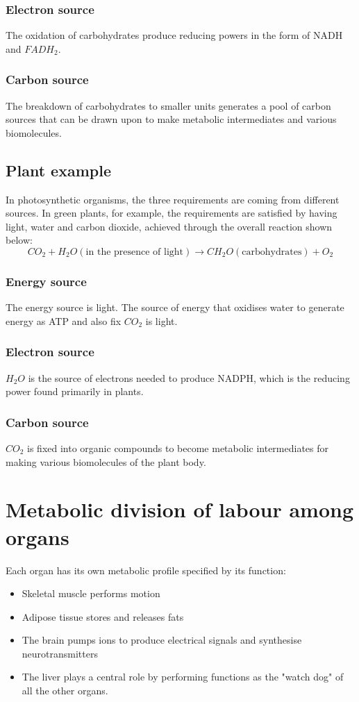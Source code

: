 \documentclass[11pt]{article}
\begin{document}
\subsubsection{Electron source}
\label{sec:org001c69a}
The oxidation of carbohydrates produce reducing powers in the form of NADH and \(FADH_2\).

\subsubsection{Carbon source}
\label{sec:org1a55f0b}
The breakdown of carbohydrates to smaller units generates a pool of carbon sources that can be drawn upon to make metabolic intermediates and various biomolecules.

\subsection{Plant example}
\label{sec:org5116db6}
In photosynthetic organisms, the three requirements are coming from different sources. In green plants, for example, the requirements are satisfied by having light, water and carbon dioxide, achieved through the overall reaction shown below:
\[CO_2 + H_2 O (\text{in the presence of light}) \rightarrow CH_2 O (\text{carbohydrates}) + O_2\]

\subsubsection{Energy source}
\label{sec:orgb0da974}
The energy source is light. The source of energy that oxidises water to generate energy as ATP and also fix \(CO_2\) is light.

\subsubsection{Electron source}
\label{sec:org0ee1761}
\(H_2 O\) is the source of electrons needed to produce NADPH, which is the reducing power found primarily in plants.

\subsubsection{Carbon source}
\label{sec:orga5bd32a}
\(CO_2\) is fixed into organic compounds to become metabolic intermediates for making various biomolecules of the plant body.


\section{Metabolic division of labour among organs}
\label{sec:org3664ea4}
Each organ has its own metabolic profile specified by its function:
\begin{itemize}
\item Skeletal muscle performs motion
\item Adipose tissue stores and releases fats
\item The brain pumps ions to produce electrical signals and synthesise neurotransmitters
\item The liver plays a central role by performing functions as the "watch dog" of all the other organs.
\end{itemize}
\end{document}
